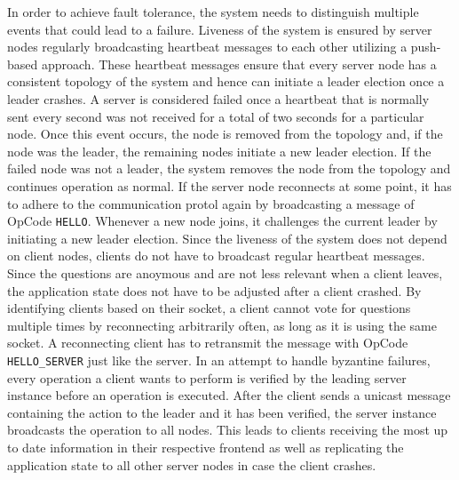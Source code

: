 \documentclass[runningheads]{llncs}
\begin{document}
In order to achieve fault tolerance, the system needs to distinguish multiple
events that could lead to a failure. Liveness of the system is ensured by
server nodes regularly broadcasting heartbeat messages to each other utilizing a push-based approach. These
heartbeat messages ensure that every server node has a consistent topology of
the system and hence can initiate a leader election once a leader crashes.
A server is considered failed once a heartbeat that is normally sent every
second was not received for a total of two seconds for a particular node.
Once this event occurs, the node is removed from the topology and, if the node
was the leader, the remaining nodes initiate a new leader election.
If the failed node was not a leader, the system removes the node from the
topology and continues operation as normal.
\newline
\newline
If the server node reconnects at some point, it has to adhere to the
communication protol again by broadcasting a message of OpCode \texttt{HELLO}. 
Whenever a new node joins, it challenges the current leader by initiating a new
leader election.
\newline
\newline
Since the liveness of the system does not depend on client nodes, clients do not
have to broadcast regular heartbeat messages. Since the questions are anoymous
and are not less relevant when a client leaves, the application state does not
have to be adjusted after a client crashed.
\newline
\newline
By identifying clients based on their socket, a client cannot vote for questions
multiple times by reconnecting arbitrarily often, as long as it is using the same
socket. A reconnecting client has to retransmit the message with OpCode
\texttt{HELLO\_SERVER} just like the server.
\newline
\newline
In an attempt to handle byzantine failures, every operation a client wants to
perform is verified by the leading server instance before an operation is
executed. After the client sends a unicast message containing the action to the
leader and it has been verified, the server instance broadcasts the operation
to all nodes. This leads to clients receiving the most up to date information
in their respective frontend as well as replicating the application state to
all other server nodes in case the client crashes.
\newline
\newline
\end{document}

